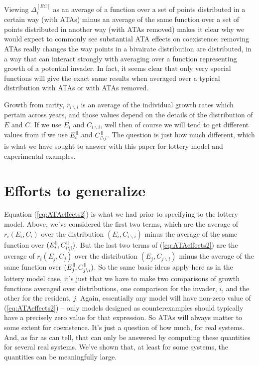 \documentclass[letterpaper,11pt]{article}
\newcommand{\nat}{%
\text{\hspace{-1.5pt}
\begin{tikzpicture}[scale=1.8]%
\draw (.333ex,0) -- (.333ex,1ex);%
\draw (.666ex,0) -- (.666ex,1ex);
\end{tikzpicture}%
}}
\newcommand{\olr}{\overline{r}}
\newcommand{\bs}{\backslash}
\begin{document}
Viewing $\Delta_i^{[EC]}$ as an average of a function over a set of points distributed in a certain way
(with ATAs) minus an average of the same function over a set of points distributed in another way
(with ATAs removed) makes it clear why we would expect to commonly see substantial ATA effects 
on coexistence: removing ATAs really changes the way points in a bivairate distribution are 
distributed, in a way that can interact strongly with averaging over a function representing growth of
a potential invader. In fact, it seems clear that only very special functions will give the exact same results 
when averaged over a typical distribution with ATAs or with ATAs removed.

Growth from rarity, $\olr_{i \bs i}$ is an average of the individual growth rates which pertain across
years, and those values depend on the details of the distribution of $E$ and $C$. If we use 
$E_i$ and $C_{i \bs i}$, well then of course we will tend to get different values
from if we use $E_i^\nat$ and $C_{i \bs i}^\nat$. The question is just how much different, which is what 
we have sought to answer with this paper for lottery model and experimental examples. 

\section{Efforts to generalize}

Equation (\ref{eq:ATAeffects2}) is what we had prior to specifying to the lottery model. 
Above, we've considered the first two terms, which are the average of $r_i(E_i,C_i)$ over 
the distribution $(E_i,C_{i \bs i})$ minus the average of the same function
over $(E_i^\nat,C_{i \bs i}^\nat)$. But the last two terms of (\ref{eq:ATAeffects2})
are the average of $r_i(E_j,C_j)$ over the distribution $(E_j,C_{j \bs i})$ minus the 
average of the same function over $(E_j^\nat,C_{j \bs i}^\nat)$. So the same basic
ideas apply here as in the lottery model case, it's just that we have to make two comparisons 
of growth functions averaged over distributions, one comparison for the invader, $i$,
and the other for the resident, $j$. Again, essentially any model will have 
non-zero value of (\ref{eq:ATAeffects2}) -- only models designed as counterexamples
should typically have a precisely zero value for that expression. So ATAs will always
matter to some extent for coexistence. It's just a question of how much, for real systems. 
And, as far as can tell, that can only be answered by computing these quantities for
several real systems. We've shown that, at least for some systems, the quantities 
can be meaningfully large.
\end{document}

